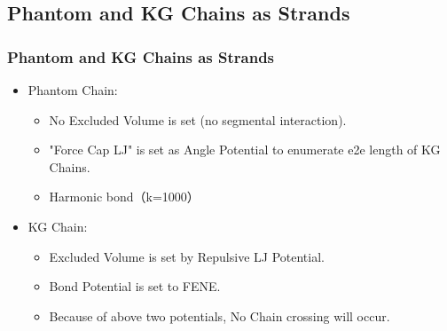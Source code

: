 \documentclass[12pt, dvipdfmx]{beamer}
\begin{document}
\subsection{Phantom and KG Chains as Strands}
\begin{frame}
	\frametitle{Phantom and KG Chains as Strands}
	\begin{itemize}
		\item Phantom Chain:
		\begin{itemize}
			\item No Excluded Volume is set (no segmental interaction).
			\item "Force Cap LJ" is set as Angle Potential to enumerate e2e length of KG Chains.
			\item Harmonic bond（k=1000）
		\end{itemize}
		\item KG Chain:
		\begin{itemize}
			\item Excluded Volume is set by Repulsive LJ Potential.
			\item Bond Potential is set to FENE.
			\item Because of above two potentials, No Chain crossing will occur.
		\end{itemize}
	\end{itemize}

\end{frame}
\end{document}
